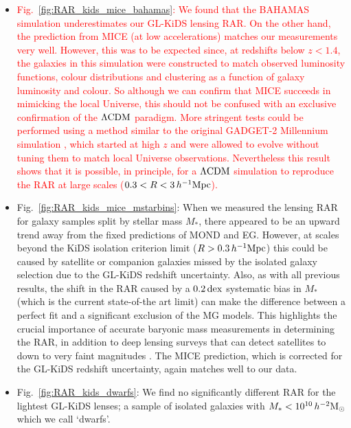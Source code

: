 \documentclass[usenatbib]{mnras}
\newcommand{\hmsun}{\,h^{-2} {\rm M_\odot}}
\newcommand{\hMpc}{\, h^{-1}{\rm{Mpc}} }
\newcommand{\lcdm}{{\rm \Lambda CDM}}
\newcommand{\dex}{\, {\rm dex}}
\begin{document}
\begin{itemize}
	\item \textcolor{red}{Fig.~\ref{fig:RAR_kids_mice_bahamas}: We found that the BAHAMAS simulation underestimates our GL-KiDS lensing RAR. On the other hand, the prediction from MICE (at low accelerations) matches our measurements very well. However, this was to be expected since, at redshifts below $z<1.4$, the galaxies in this simulation were constructed to match observed luminosity functions, colour distributions and clustering as a function of galaxy luminosity and colour. So although we can confirm that MICE succeeds in mimicking the local Universe, this should not be confused with an exclusive confirmation of the $\lcdm$ paradigm. More stringent tests could be performed using a method similar to the original {\scshape GADGET-2} Millennium simulation \cite[]{springel2001,springel2005}, which started at high $z$ and were allowed to evolve without tuning them to match local Universe observations. Nevertheless this result shows that it is possible, in principle, for a $\lcdm$ simulation to reproduce the RAR at large scales ($0.3 < R < 3 \hMpc$).}
	
	\item Fig.~\ref{fig:RAR_kids_mice_mstarbins}: When we measured the lensing RAR for galaxy samples split by stellar mass $M_*$, there appeared to be an upward trend away from the fixed predictions of MOND and EG. However, at scales beyond the KiDS isolation criterion limit ($R>0.3 \hMpc$) this could be caused by satellite or companion galaxies missed by the isolated galaxy selection due to the GL-KiDS redshift uncertainty. Also, as with all previous results, the shift in the RAR caused by a $0.2 \dex$ systematic bias in $M_*$ (which is the current state-of-the art limit) can make the difference between a perfect fit and a significant exclusion of the MG models. This highlights the crucial importance of accurate baryonic mass measurements in determining the RAR, in addition to deep lensing surveys that can detect satellites to down to very faint magnitudes \cite[such as the future Euclid survey;][]{laureijs2011}. The MICE prediction, which is corrected for the GL-KiDS redshift uncertainty, again matches well to our data.
	
	\item Fig.~\ref{fig:RAR_kids_dwarfs}: We find no significantly different RAR for the lightest GL-KiDS lenses; a sample of isolated galaxies with $M_* < 10^{10} \hmsun$ which we call `dwarfs'.
	

\end{itemize}
\end{document}
